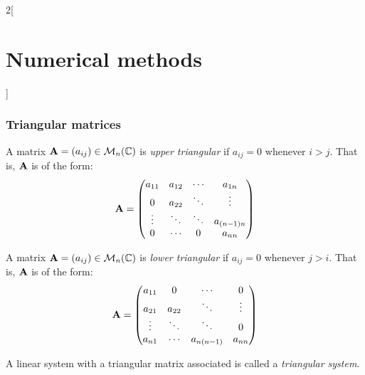 \documentclass[../../../main_math.tex]{subfiles}
\begin{document}
\begin{multicols}{2}[\section{Numerical methods}]
  \subsubsection{Triangular matrices}
  \begin{definition}
    A matrix $\boldsymbol{\mathrm{A}}=(a_{ij})\in\mathcal{M}_n(\mathbb{C})$ is \emph{upper triangular} if $a_{ij}=0$ whenever $i>j$. That is, $\boldsymbol{\mathrm{A}}$ is of the form:
    $$\boldsymbol{\mathrm{A}}=
      \begin{pmatrix}
        a_{11} & a_{12} & \cdots & a_{1n}     \\
        0      & a_{22} & \ddots & \vdots     \\
        \vdots & \ddots & \ddots & a_{(n-1)n} \\
        0      & \cdots & 0      & a_{nn}
      \end{pmatrix}
    $$
  \end{definition}
  \begin{definition}
    A matrix $\boldsymbol{\mathrm{A}}=(a_{ij})\in\mathcal{M}_n(\mathbb{C})$ is \emph{lower triangular} if $a_{ij}=0$ whenever $j>i$. That is, $\boldsymbol{\mathrm{A}}$ is of the form:
    $$\boldsymbol{\mathrm{A}}=
      \begin{pmatrix}
        a_{11} & 0      & \cdots     & 0      \\
        a_{21} & a_{22} & \ddots     & \vdots \\
        \vdots & \ddots & \ddots     & 0      \\
        a_{n1} & \cdots & a_{n(n-1)} & a_{nn}
      \end{pmatrix}
    $$
  \end{definition}
  \begin{definition}
    A linear system with a triangular matrix associated is called a \emph{triangular system}.
  \end{definition}

\end{multicols}
\end{document}
